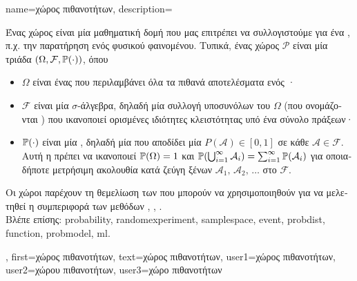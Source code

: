  {name={\foreignlanguage{greek}{χώρος πιθανοτήτων}}, 
 	description={\foreignlanguage{greek}{Ένας χώρος}  
		\foreignlanguage{greek}{είναι μία μαθηματική δομή που μας επιτρέπει να συλλογιστούμε για ένα} , 
		\foreignlanguage{greek}{π.χ. την παρατήρηση ενός φυσικού φαινομένου. Τυπικά, ένας χώρος}  $\mathcal{P}$ 
		\foreignlanguage{greek}{είναι μία τριάδα $(\Omega, \mathcal{F}, \mathbb{P}({\cdot}))$, όπου}
 		\begin{itemize} 
 			\item  $\Omega$ \foreignlanguage{greek}{είναι ένας}  \foreignlanguage{greek}{που περιλαμβάνει όλα 
			τα πιθανά αποτελέσματα ενός} ·
 			\item  $\mathcal{F}$ \foreignlanguage{greek}{είναι μία $\sigma$-άλγεβρα, δηλαδή μία συλλογή υποσυνόλων του $\Omega$ (που ονομάζονται} 
			) \foreignlanguage{greek}{που ικανοποιεί ορισμένες ιδιότητες κλειστότητας υπό ένα σύνολο πράξεων·}
 			\item $\mathbb{P}({\cdot})$ \foreignlanguage{greek}{είναι μία} , \foreignlanguage{greek}{δηλαδή μία}  
			\foreignlanguage{greek}{που αποδίδει μία}  $P(\mathcal{A}) \in [0,1]$ 
 			\foreignlanguage{greek}{σε κάθε}  $\mathcal{A} \in \mathcal{F}$. \foreignlanguage{greek}{Αυτή η} 
			 \foreignlanguage{greek}{πρέπει να ικανοποιεί $\mathbb{P}({\Omega}) = 1$ και 
			$\mathbb{P}({\bigcup_{i=1}^{\infty} \mathcal{A}_i}) = \sum_{i=1}^{\infty} \mathbb{P}({\mathcal{A}_i})$ για οποιαδήποτε μετρήσιμη ακολουθία κατά 
			ζεύγη ξένων}  $\mathcal{A}_1, \,\mathcal{A}_2, \,\ldots$ \foreignlanguage{greek}{στο} $\mathcal{F}$.
 		\end{itemize}
 		\foreignlanguage{greek}{Οι χώροι}  \foreignlanguage{greek}{παρέχουν τη θεμελίωση των}  
		\foreignlanguage{greek}{που μπορούν να χρησιμοποιηθούν για να μελετηθεί η συμπεριφορά των μεθόδων} 
		\cite{BillingsleyProbMeasure}, \cite{GrayProbBook}, \cite{ross2013first}.\\
		\foreignlanguage{greek}{Βλέπε επίσης:} \gls{probability}, \gls{randomexperiment}, \gls{samplespace}, \gls{event}, \gls{probdist}, \gls{function}, 
		\gls{probmodel}, \gls{ml}.},  
 	first={\foreignlanguage{greek}{χώρος πιθανοτήτων}}, 
 	text={\foreignlanguage{greek}{χώρος πιθανοτήτων}},
	user1={\foreignlanguage{greek}{χώρος πιθανοτήτων}}, %
  	user2={\foreignlanguage{greek}{χώρου πιθανοτήτων}}, %
	user3={\foreignlanguage{greek}{χώρο πιθανοτήτων}} %
 }

